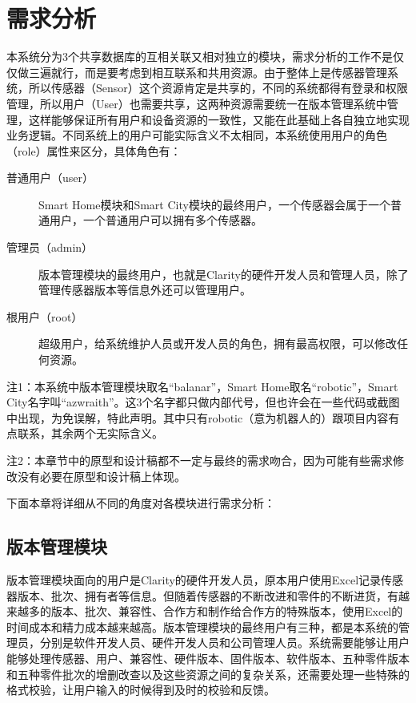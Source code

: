 
\chapter{需求分析}
\label{chap:requirement}
本系统分为3个共享数据库的互相关联又相对独立的模块，需求分析的工作不是仅仅做三遍就行，而是要考虑到相互联系和共用资源。由于整体上是传感器管理系统，所以传感器（Sensor）这个资源肯定是共享的，不同的系统都得有登录和权限管理，所以用户（User）也需要共享，这两种资源需要统一在版本管理系统中管理，这样能够保证所有用户和设备资源的一致性，又能在此基础上各自独立地实现业务逻辑。不同系统上的用户可能实际含义不太相同，本系统使用用户的角色（role）属性来区分，具体角色有：
\begin{description}
  \item[普通用户（user）] Smart Home模块和Smart City模块的最终用户，一个传感器会属于一个普通用户，一个普通用户可以拥有多个传感器。
  \item[管理员（admin）] 版本管理模块的最终用户，也就是Clarity的硬件开发人员和管理人员，除了管理传感器版本等信息外还可以管理用户。
  \item[根用户（root）] 超级用户，给系统维护人员或开发人员的角色，拥有最高权限，可以修改任何资源。
\end{description}

注1：本系统中版本管理模块取名“balanar”，Smart Home取名“robotic”，Smart City名字叫“azwraith”。这3个名字都只做内部代号，但也许会在一些代码或截图中出现，为免误解，特此声明。其中只有robotic（意为机器人的）跟项目内容有点联系，其余两个无实际含义。

注2：本章节中的原型和设计稿都不一定与最终的需求吻合，因为可能有些需求修改没有必要在原型和设计稿上体现。

下面本章将详细从不同的角度对各模块进行需求分析：
\section{版本管理模块}
版本管理模块面向的用户是Clarity的硬件开发人员，原本用户使用Excel记录传感器版本、批次、拥有者等信息。但随着传感器的不断改进和零件的不断进货，有越来越多的版本、批次、兼容性、合作方和制作给合作方的特殊版本，使用Excel的时间成本和精力成本越来越高。版本管理模块的最终用户有三种，都是本系统的管理员，分别是软件开发人员、硬件开发人员和公司管理人员。系统需要能够让用户能够处理传感器、用户、兼容性、硬件版本、固件版本、软件版本、五种零件版本和五种零件批次的增删改查以及这些资源之间的复杂关系，还需要处理一些特殊的格式校验，让用户输入的时候得到及时的校验和反馈。

